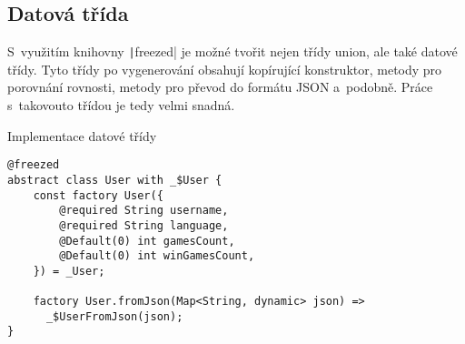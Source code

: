 \subsection{Datová třída}

S~využitím knihovny \texttt|freezed| je možné tvořit nejen
třídy union,
ale také datové třídy.
Tyto třídy po vygenerování obsahují kopírující konstruktor,
metody pro porovnání rovnosti,
metody pro převod do formátu JSON a~podobně.
Práce s~takovouto třídou je tedy velmi snadná.

\begin{listing}
    \caption{Implementace datové třídy}
    \label{code:implementation-2}
    \begin{verbatim}
@freezed
abstract class User with _$User {
    const factory User({
        @required String username,
        @required String language,
        @Default(0) int gamesCount,
        @Default(0) int winGamesCount,
    }) = _User;

    factory User.fromJson(Map<String, dynamic> json) =>
      _$UserFromJson(json);
}
    \end{verbatim}
\end{listing}

